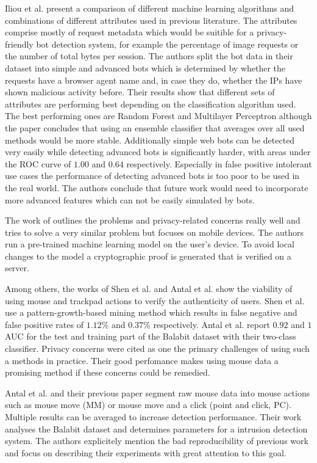 \documentclass[
    fontsize=12pt,
    headings=small,
    parskip=half,           %
    bibliography=totoc,
    numbers=noenddot,       %
    open=any,               %
    final                   %
]{scrreprt}
\begin{document}
Iliou et al. \cite{10.1145/3339252.3339267} present a comparison of different machine learning algorithms and combinations of different attributes used in previous literature. The attributes comprise mostly of request metadata which would be suitible for a privacy-friendly bot detection system, for example the percentage of image requests or the number of total bytes per session. The authors split the bot data in their dataset into simple and advanced bots which is determined by whether the requests have a browser agent name and, in case they do, whether the IPs have shown malicious activity before. Their results show that different sets of attributes are performing best depending on the classification algorithm used. The best performing ones are Random Forest and Multilayer Perceptron although the paper concludes that using an ensemble classifier that averages over all used methods would be more stable. Additionally simple web bots can be detected very easily while detecting advanced bots is significantly harder, with areas under the ROC curve of $1.00$ and $0.64$ respectively. Especially in false positive intolerant use cases the performance of detecting advanced bots is too poor to be used in the real world. The authors conclude that future work would need to incorporate more advanced features which can not be easily simulated by bots.

The work of \cite{PETS2021} outlines the problems and privacy-related concerns really well and tries to solve a very similar problem but focuses on mobile devices. The authors run a pre-trained machine learning model on the user's device. To avoid local changes to the model a cryptographic proof is generated that is verified on a server.

Among others, the works of Shen et al. \cite{6263955} and Antal et al. \cite{9111596} show the viability of using mouse and trackpad actions to verify the authenticity of users.
Shen et al. use a pattern-growth-based mining method which results in false negative and false positive rates of $1.12\%$ and $0.37\%$ respectively.
Antal et al. report $0.92$ and $1$ AUC for the test and training part of the Balabit dataset \cite{BALABIT_CHALLENGE} with their two-class classifier.
Privacy concerns were cited as one the primary challenges of using such a methods in practice. Their good perfomance makes using mouse data a promising method if these concerns could be remedied.

Antal et al.\cite{9111596} and their previous paper\cite{https://doi.org/10.1049/iet-bmt.2018.5126} segment raw mouse data into mouse actions such as mouse move (MM) or mouse move and a click (point and click, PC). Multiple results can be averaged to increase detection performance. Their work analyses the Balabit dataset and determines parameters for a intrusion detection system. The authors explicitely mention the bad reproducibility of previous work and focus on describing their experiments with great attention to this goal.
\end{document}
